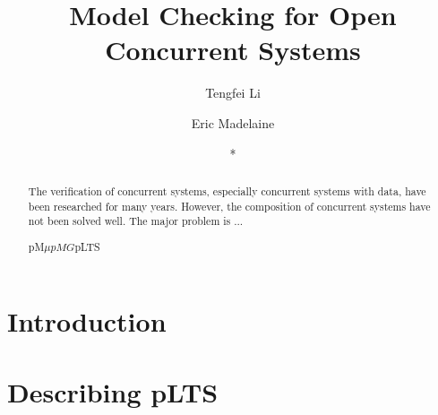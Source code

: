 \documentclass[runningheads,a4paper]{llncs}
\newcommand{\keywords}[1]{\par\addvspace\baselineskip
\noindent\keywordname\enspace\ignorespaces#1}
\begin{document}
\mainmatter  %

\title{Model Checking for Open Concurrent Systems}


%
%
\author{Tengfei Li
\and Eric Madelaine \and *
}
%



\institute{
}

%
%

\maketitle


\begin{abstract}

The verification of concurrent systems, especially concurrent systems with data, have been researched for many years. However, the composition of concurrent systems have not been solved well. The major problem is ...

\keywords{ pM$\mu$\quad $pMG $\quad pLTS }
\end{abstract}


\section{Introduction}


\section{Describing pLTS}
\end{document}
